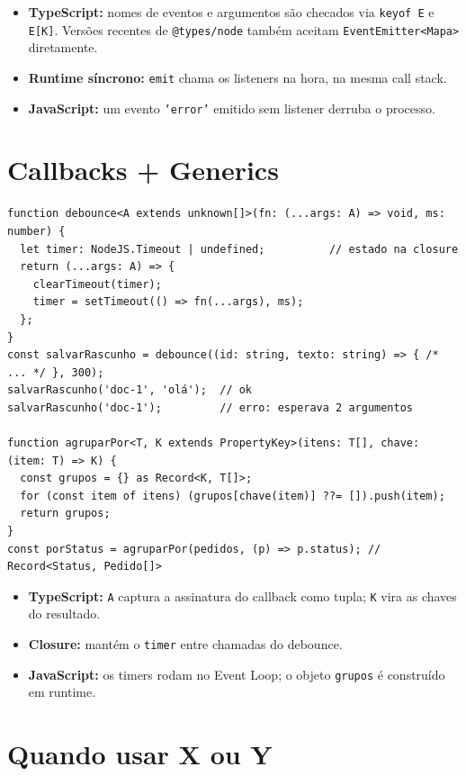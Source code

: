 \documentclass[12pt,a4paper,oneside]{book}
\newcommand{\code}[1]{\texttt{#1}}
\begin{document}
\begin{itemize}
  \item \textbf{TypeScript:} nomes de eventos e argumentos são checados via \code{keyof E} e \code{E[K]}. Versões recentes de \code{@types/node} também aceitam \code{EventEmitter<Mapa>} diretamente.
  \item \textbf{Runtime síncrono:} \code{emit} chama os listeners na hora, na mesma call stack.
  \item \textbf{JavaScript:} um evento \code{'error'} emitido sem listener derruba o processo.
\end{itemize}

\section{Callbacks + Generics}

\begin{verbatim}
function debounce<A extends unknown[]>(fn: (...args: A) => void, ms: number) {
  let timer: NodeJS.Timeout | undefined;          // estado na closure
  return (...args: A) => {
    clearTimeout(timer);
    timer = setTimeout(() => fn(...args), ms);
  };
}
const salvarRascunho = debounce((id: string, texto: string) => { /* ... */ }, 300);
salvarRascunho('doc-1', 'olá');  // ok
salvarRascunho('doc-1');         // erro: esperava 2 argumentos

function agruparPor<T, K extends PropertyKey>(itens: T[], chave: (item: T) => K) {
  const grupos = {} as Record<K, T[]>;
  for (const item of itens) (grupos[chave(item)] ??= []).push(item);
  return grupos;
}
const porStatus = agruparPor(pedidos, (p) => p.status); // Record<Status, Pedido[]>
\end{verbatim}

\begin{itemize}
  \item \textbf{TypeScript:} \code{A} captura a assinatura do callback como tupla; \code{K} vira as chaves do resultado.
  \item \textbf{Closure:} mantém o \code{timer} entre chamadas do debounce.
  \item \textbf{JavaScript:} os timers rodam no Event Loop; o objeto \code{grupos} é construído em runtime.
\end{itemize}

\section{Quando usar X ou Y}
\end{document}
